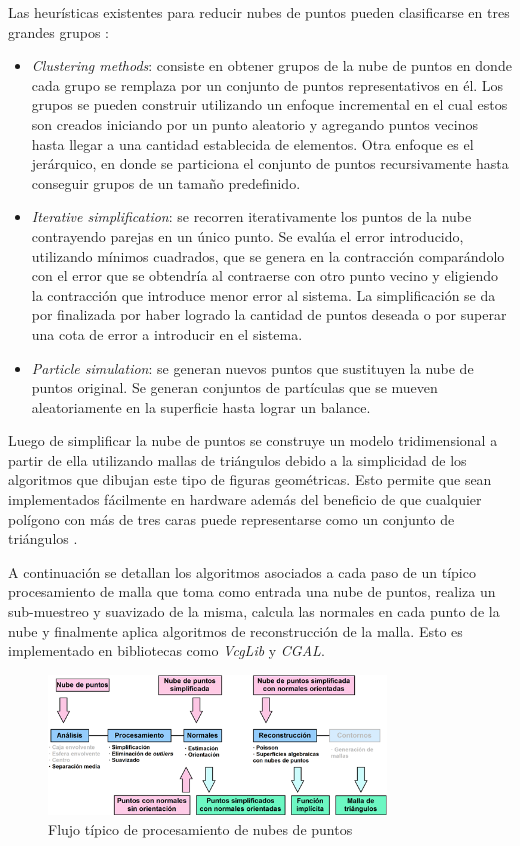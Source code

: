 Las heurísticas existentes para reducir nubes de puntos pueden clasificarse en tres grandes grupos \cite{PntCloud}:
\begin{itemize}
   \item \emph{Clustering methods}: consiste en obtener grupos de la nube de puntos en donde cada grupo se remplaza por un conjunto de puntos representativos en él. Los grupos se pueden construir utilizando un enfoque incremental en el cual estos son creados iniciando por un punto aleatorio y agregando puntos vecinos hasta llegar a una cantidad establecida de elementos. Otra enfoque es el jerárquico, en donde se particiona el conjunto de puntos recursivamente hasta conseguir grupos de un tamaño predefinido.
   \item \emph{Iterative simplification}: se recorren iterativamente los puntos de la nube contrayendo parejas en un único punto. Se evalúa el error introducido, utilizando mínimos cuadrados, que se genera en la contracción comparándolo con el error que se obtendría al contraerse con otro punto vecino y eligiendo la contracción que introduce menor error al sistema. La simplificación se da por finalizada por haber logrado la cantidad de puntos deseada o por superar una cota de error a introducir en el sistema.
   \item \emph{Particle simulation}: se generan nuevos puntos que sustituyen la nube de puntos original. Se generan conjuntos de partículas que se mueven aleatoriamente en la superficie hasta lograr un balance.
\end{itemize}

Luego de simplificar la nube de puntos se construye un modelo tridimensional a partir de ella utilizando mallas de triángulos debido a la simplicidad de los algoritmos que dibujan este tipo de figuras geométricas. Esto permite que sean implementados fácilmente en hardware además del beneficio de que cualquier polígono con más de tres caras puede representarse como un conjunto de triángulos \cite{PCloudTriangle}.

A continuación se detallan los algoritmos asociados a cada paso de un típico procesamiento de malla que toma como entrada una nube de puntos, realiza un sub-muestreo y suavizado de la misma, calcula las normales en cada punto de la nube y finalmente aplica algoritmos de reconstrucción de la malla. Esto es implementado en bibliotecas como \emph{VcgLib}\cite{VCGLib} y \emph{CGAL}\cite{CGAL}.

\begin{figure}[H]
  \centering
    \includegraphics[width=0.8\textwidth]{./Cap2_videomapping/malla-flow-2.png}
  \caption{Flujo típico de procesamiento de nubes de puntos \cite{CGAL}}
  \label{fig:Mesh-CGAL}
\end{figure}

